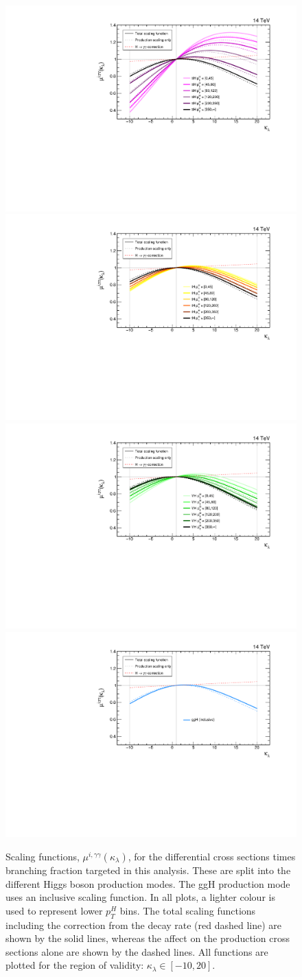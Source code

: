 \begin{figure}[htb!]
  \centering
  \includegraphics[width=.49\textwidth]{Figures/cms/trilinear/ttH.pdf}
  \includegraphics[width=.49\textwidth]{Figures/cms/trilinear/tH.pdf}
  \includegraphics[width=.49\textwidth]{Figures/cms/trilinear/VH.pdf}
  \includegraphics[width=.49\textwidth]{Figures/cms/trilinear/ggH.pdf}
  \caption[Scaling functions in terms of $\kappa_\lambda$]
  {
    Scaling functions, $\mu^{i,\gamma\gamma}(\kappa_\lambda)$, for the differential cross sections times branching fraction targeted in this analysis. These are split into the different Higgs boson production modes. The ggH production mode uses an inclusive scaling function. In all plots, a lighter colour is used to represent lower $p_T^H$ bins. The total scaling functions including the correction from the \Hgg decay rate (red dashed line) are shown by the solid lines, whereas the affect on the production cross sections alone are shown by the dashed lines. All functions are plotted for the region of validity: $\kappa_\lambda \in [-10,20]$.
  }
  \label{fig:trilinear_sf}
\end{figure}

